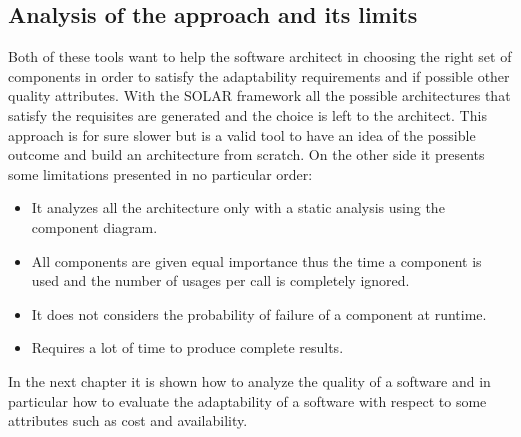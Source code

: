 \subsection{Analysis of the approach and its limits}
Both of these tools want to help the software architect in choosing the right set of components in order to satisfy the adaptability requirements and if possible other quality attributes. With the SOLAR framework all the possible architectures that satisfy the requisites are generated and the choice is left to the architect. This approach is for sure slower but is a valid tool to have an idea of the possible outcome and build an architecture from scratch. On the other side it presents some limitations presented in no particular order:
\begin{itemize}
	\item It analyzes all the architecture only with a static analysis using the component diagram.
	\item All components are given equal importance thus the time a component is used and the number of usages per call is completely ignored.
	\item It does not considers the probability of failure of a component at runtime.
	\item Requires a lot of time to produce complete results.
\end{itemize}
In the next chapter it is shown how to analyze the quality of a software and in particular how to evaluate the adaptability of a software with respect to some attributes such as cost and availability.